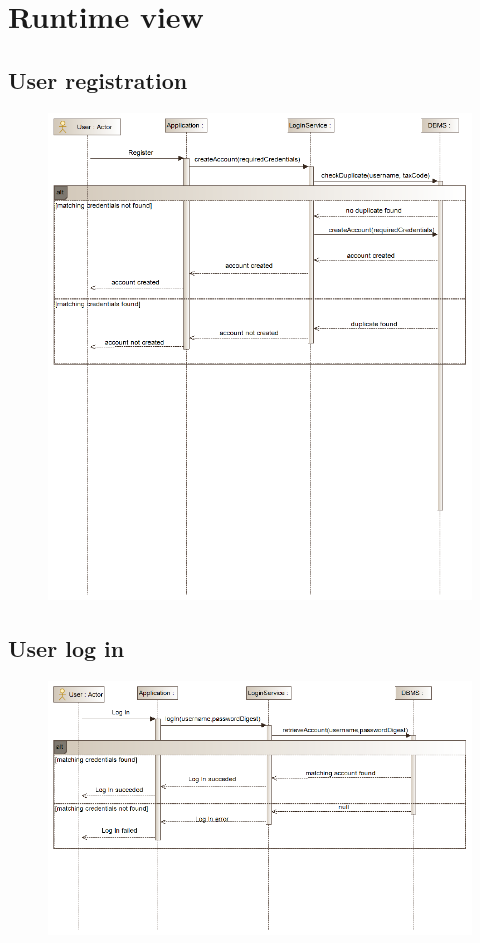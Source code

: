 \section{Runtime view}
\subsection{User registration}
\begin{figure}[h]
\centering
\includegraphics[width=\linewidth]{resources/uml/sequence/Registration.png}
\end{figure}

\subsection{User log in}
\begin{figure}[h]
\centering
\includegraphics[width=\linewidth]{resources/uml/sequence/LogIn.png}
\end{figure}

